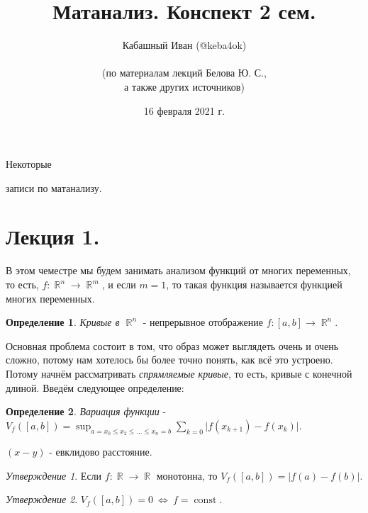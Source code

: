 \documentclass[a4paper,100pt]{article}
\title{Матанализ. Конспект 2 сем.}
\author{Кабашный Иван (@keba4ok)\\ \\ (по материалам лекций Белова Ю. С.,\\ а также других источников)}
\date{16 февраля 2021 г.}
\theoremstyle{indented}
\theoremstyle{definition}
\newtheorem{defn}{Определение}
\theoremstyle{remark}
\newtheorem{stat}{Утверждение}
\DeclareMathOperator{\RR}{\mathbb{R}}
\DeclareMathOperator{\const}{const}
\begin{document}
\newcommand{\resetexlcounters}{%
  \setcounter{exl}{0}%
} 

\newcommand{\resetremarkcounters}{%
  \setcounter{remark}{0}%
} 

\newcommand{\reseconscounters}{%
  \setcounter{cons}{0}%
} 

\newcommand{\resetall}{%
    \resetexlcounters
    \resetremarkcounters
    \reseconscounters%
}

\maketitle 

\newpage

\hypertarget{t1}{Некоторые} записи по матанализу.
\tableofcontents

\newpage


\section{Лекция 1.}

В этом чеместре мы будем занимать анализом функций от многих переменных, то есть,  $f:\RR^n\rightarrow \RR^m$,  и если $m=1$, то такая функция называется функцией многих переменных. \ 

\begin{defn}
    \textit{Кривые в $\RR^n$} - непрерывное отображение $f:[a, b]\rightarrow \RR^n$.
\end{defn}

Основная проблема состоит в том, что образ может выглядеть очень и очень сложно, потому нам хотелось бы более точно понять, как всё это устроено. Потому начнём рассматривать \textit{спрямляемые кривые}, то есть, кривые с конечной длиной. Введём следующее определение: 

\begin{defn}
    \textit{Вариация функции} - $V_f([a, b])=\sup_{a=x_0\leq x_2\leq \ldots\leq x_n=b} \sum_{k=0}\vert f(x_{k+1})-f(x_k)\vert$. 
\end{defn}

$(x-y)$ - евклидово расстояние.

\begin{stat}
    Если $f:\RR\rightarrow \RR$ монотонна, то $V_f([a, b])=\vert f(a)-f(b)\vert $.
\end{stat}

\begin{stat}
    $V_f([a, b])=0 \: \Leftrightarrow \: f=\const$.
\end{stat}
\end{document}
